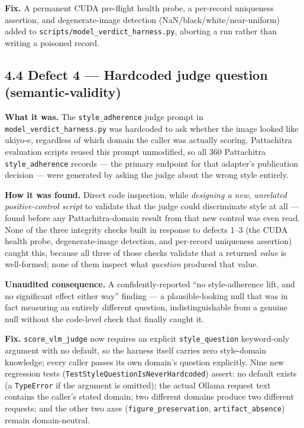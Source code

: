 \textbf{Fix.} A permanent CUDA pre-flight health probe, a per-record
uniqueness assertion, and degenerate-image detection
(NaN/black/white/near-uniform) added to
\texttt{scripts/model\_verdict\_harness.py}, aborting a run rather than
writing a poisoned record.

\hypertarget{defect-4-hardcoded-judge-question-semantic-validity}{%
\subsection{4.4 Defect 4 --- Hardcoded judge question
(semantic-validity)}\label{defect-4-hardcoded-judge-question-semantic-validity}}

\textbf{What it was.} The \texttt{style\_adherence} judge prompt in
\texttt{model\_verdict\_harness.py} was hardcoded to ask whether the
image looked like ukiyo-e, regardless of which domain the caller was
actually scoring. Pattachitra evaluation scripts reused this prompt
unmodified, so all 360 Pattachitra \texttt{style\_adherence} records ---
the primary endpoint for that adapter's publication decision --- were
generated by asking the judge about the wrong style entirely.

\textbf{How it was found.} Direct code inspection, while \emph{designing
a new, unrelated positive-control script} to validate that the judge
could discriminate style at all --- found before any Pattachitra-domain
result from that new control was even read. None of the three integrity
checks built in response to defects 1--3 (the CUDA health probe,
degenerate-image detection, and per-record uniqueness assertion) caught
this, because all three of those checks validate that a returned
\emph{value} is well-formed; none of them inspect what \emph{question}
produced that value.

\textbf{Unaudited consequence.} A confidently-reported ``no
style-adherence lift, and no significant effect either way'' finding ---
a plausible-looking null that was in fact measuring an entirely
different question, indistinguishable from a genuine null without the
code-level check that finally caught it.

\textbf{Fix.} \texttt{score\_vlm\_judge} now requires an explicit
\texttt{style\_question} keyword-only argument with no default, so the
harness itself carries zero style-domain knowledge; every caller passes
its own domain's question explicitly. Nine new regression tests
(\texttt{TestStyleQuestionIsNeverHardcoded}) assert: no default exists
(a \texttt{TypeError} if the argument is omitted); the actual Ollama
request text contains the caller's stated domain; two different domains
produce two different requests; and the other two axes
(\texttt{figure\_preservation}, \texttt{artifact\_absence}) remain
domain-neutral.

